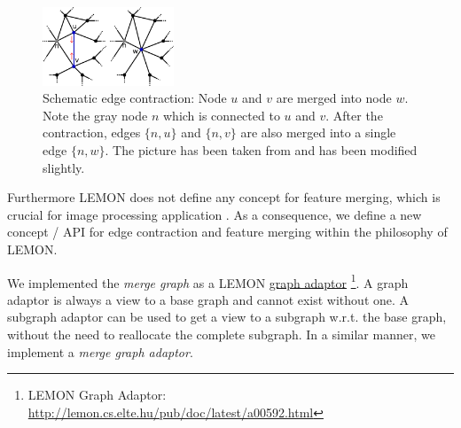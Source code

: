 \begin{figure}[H]
    \centering
    \includegraphics[width=0.35\textwidth]{fig/contraction.pdf}

    \caption[Schematic edge contraction]{ Schematic edge contraction: Node $u$ and $v$ are merged into node $w$.
        Note the gray node $n$ which is connected to $u$ and $v$.
        After the contraction, edges $\{ n,u\}$ and $\{ n,v\}$ are also merged into 
        a single edge $\{ n, w\}$.
        The picture has been taken from \citep{wiki_edge_contraction} and has been modified slightly.
    }
    \label{fig:e_contract}
\end{figure}


Furthermore LEMON does not define any concept for feature merging, which
is crucial for image processing application \citep{arbelaez_2006_cvpr}.
As a consequence, we define a new concept / API for 
edge contraction and feature merging within the philosophy of LEMON.

We implemented the \emph{merge graph} as a LEMON  \href{http://lemon.cs.elte.hu/pub/doc/latest/a00592.html}{graph adaptor}
\footnote{ LEMON Graph Adaptor: \url{http://lemon.cs.elte.hu/pub/doc/latest/a00592.html} }.
A graph adaptor is always a view to a base graph and cannot exist without one.
A subgraph adaptor can be used to get a view to a subgraph w.r.t. the base graph, without
the need to reallocate the complete subgraph.
In a similar manner, we implement a \emph{merge graph adaptor}.

